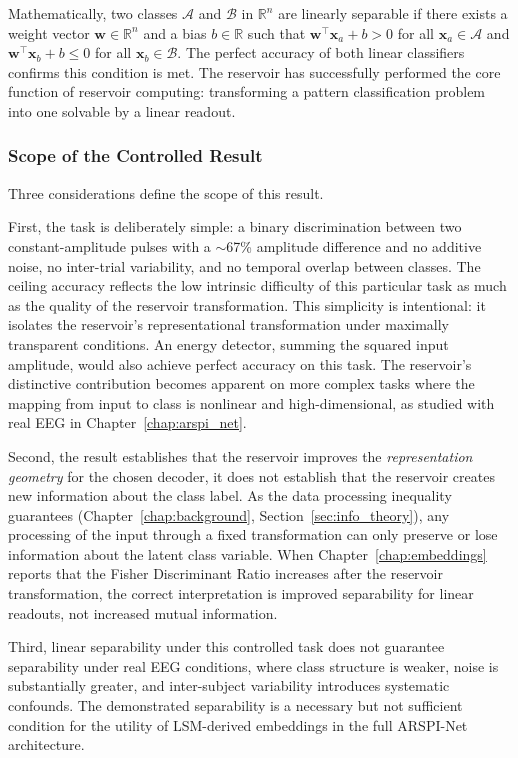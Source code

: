 Mathematically, two classes $\mathcal{A}$ and $\mathcal{B}$ in $\mathbb{R}^n$ are linearly separable if there exists a weight vector $\mathbf{w} \in \mathbb{R}^n$ and a bias $b \in \mathbb{R}$ such that $\mathbf{w}^\top \mathbf{x}_a + b > 0$ for all $\mathbf{x}_a \in \mathcal{A}$ and $\mathbf{w}^\top \mathbf{x}_b + b \leq 0$ for all $\mathbf{x}_b \in \mathcal{B}$. The perfect accuracy of both linear classifiers confirms this condition is met. The reservoir has successfully performed the core function of reservoir computing: transforming a pattern classification problem into one solvable by a linear readout.

\subsubsection{Scope of the Controlled Result}

Three considerations define the scope of this result.

First, the task is deliberately simple: a binary discrimination between two constant-amplitude pulses with a $\sim$67\% amplitude difference and no additive noise, no inter-trial variability, and no temporal overlap between classes. The ceiling accuracy reflects the low intrinsic difficulty of this particular task as much as the quality of the reservoir transformation. This simplicity is intentional: it isolates the reservoir's representational transformation under maximally transparent conditions. An energy detector, summing the squared input amplitude, would also achieve perfect accuracy on this task. The reservoir's distinctive contribution becomes apparent on more complex tasks where the mapping from input to class is nonlinear and high-dimensional, as studied with real EEG in Chapter~\ref{chap:arspi_net}.

Second, the result establishes that the reservoir improves the \emph{representation geometry} for the chosen decoder, it does not establish that the reservoir creates new information about the class label. As the data processing inequality guarantees (Chapter~\ref{chap:background}, Section~\ref{sec:info_theory}), any processing of the input through a fixed transformation can only preserve or lose information about the latent class variable. When Chapter~\ref{chap:embeddings} reports that the Fisher Discriminant Ratio increases after the reservoir transformation, the correct interpretation is improved separability for linear readouts, not increased mutual information.

Third, linear separability under this controlled task does not guarantee separability under real EEG conditions, where class structure is weaker, noise is substantially greater, and inter-subject variability introduces systematic confounds. The demonstrated separability is a necessary but not sufficient condition for the utility of LSM-derived embeddings in the full ARSPI-Net architecture.

